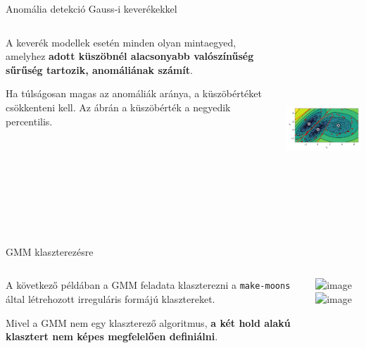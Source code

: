 \documentclass[english, aspectratio=169]{beamer}
\begin{document}
\begin{frame}{Anomália detekció Gauss-i keverékekkel}
\begin{columns}
\begin{column}{.5\textwidth}
A keverék modellek esetén minden olyan mintaegyed, amelyhez \textbf{adott küszöbnél alacsonyabb valószínűség sűrűség tartozik, anomáliának számít}.\par\smallskip
Ha túlságosan magas az anomáliák aránya, a küszöbértéket csökkenteni kell. Az ábrán a küszöbérték a negyedik percentilis.
\end{column}
\begin{column}{.5\textwidth}
\begin{center}
\includegraphics[width=7cm, height=7cm, keepaspectratio]{images/generative_24.png}
\end{center}
\end{column}
\end{columns}
\end{frame}

\begin{frame}{GMM klaszterezésre}
\begin{columns}
\begin{column}{.5\textwidth}
A következő példában a GMM feladata klaszterezni a \texttt{make-moons} által létrehozott irreguláris formájú klasztereket.\par\smallskip
Mivel a GMM nem egy klaszterező algoritmus, \textbf{a két hold alakú klasztert nem képes megfelelően definiálni}. 
\end{column}
\begin{column}{.5\textwidth}
\begin{center}
\includegraphics<1>[width=7cm, height=7cm, keepaspectratio]{images/generative_25.png}
\includegraphics<2>[width=7cm, height=7cm, keepaspectratio]{images/generative_27.png}
\end{center}
\end{column}
\end{columns}
\end{frame}
\end{document}

